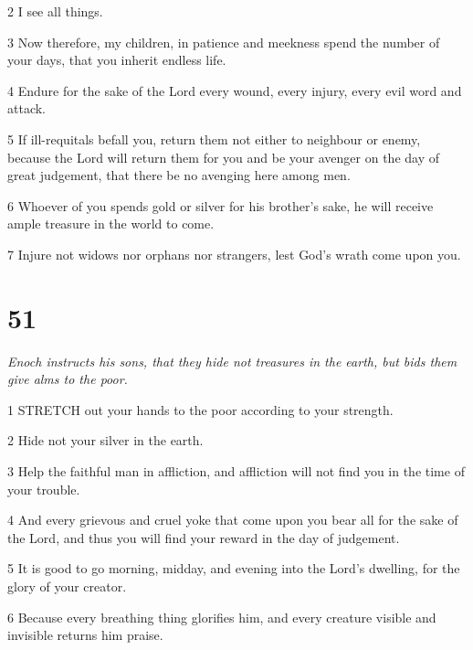 \par 2 I see all things.

\par 3 Now therefore, my children, in patience and meekness spend the number of your days, that you inherit endless life.

\par 4 Endure for the sake of the Lord every wound, every injury, every evil word and attack.

\par 5 If ill-requitals befall you, return them not either to neighbour or enemy, because the Lord will return them for you and be your avenger on the day of great judgement, that there be no avenging here among men.

\par 6 Whoever of you spends gold or silver for his brother's sake, he will receive ample treasure in the world to come.

\par 7 Injure not widows nor orphans nor strangers, lest God's wrath come upon you.

\chapter{51}

\par \textit{Enoch instructs his sons, that they hide not treasures in the earth, but bids them give alms to the poor.}

\par 1 STRETCH out your hands to the poor according to your strength.

\par 2 Hide not your silver in the earth.

\par 3 Help the faithful man in affliction, and affliction will not find you in the time of your trouble.

\par 4 And every grievous and cruel yoke that come upon you bear all for the sake of the Lord, and thus you will find your reward in the day of judgement.

\par 5 It is good to go morning, midday, and evening into the Lord's dwelling, for the glory of your creator.

\par 6 Because every breathing thing glorifies him, and every creature visible and invisible returns him praise.

